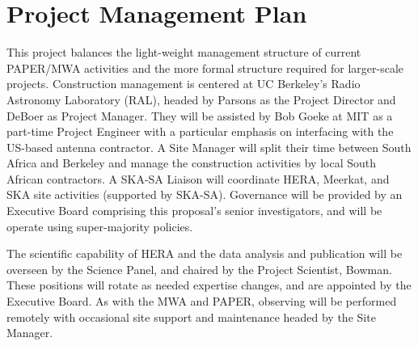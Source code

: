 \documentclass[preprint]{aastex}
\begin{document}
%
%
%
%
%
%
%

\vspace{-0.25in}
\section{Project Management Plan}
\label{PMPsec}

This project balances the light-weight management structure of current PAPER/MWA
activities and the more formal structure required for larger-scale projects.
Construction management is centered at UC Berkeley's Radio Astronomy Laboratory
(RAL), headed by Parsons as the Project Director and DeBoer as
Project Manager. They will be assisted by Bob Goeke at MIT as a part-time
Project Engineer with a particular emphasis on interfacing with the US-based
antenna contractor.  A Site Manager will split their time between South Africa
and Berkeley and manage the construction activities by local South African
contractors. A SKA-SA Liaison will coordinate HERA, Meerkat, and SKA site
activities (supported by SKA-SA). Governance will be provided by an Executive Board comprising
this proposal's senior investigators, and will be operate using
super-majority policies. 

The scientific capability of HERA and the data analysis and publication will be
overseen by the Science Panel, and chaired by the Project Scientist, Bowman. These
positions will rotate as needed expertise changes, and are appointed by the
Executive Board.  As with the MWA and PAPER, observing
will be performed remotely with occasional site support
and maintenance headed by the Site Manager.
\end{document}
